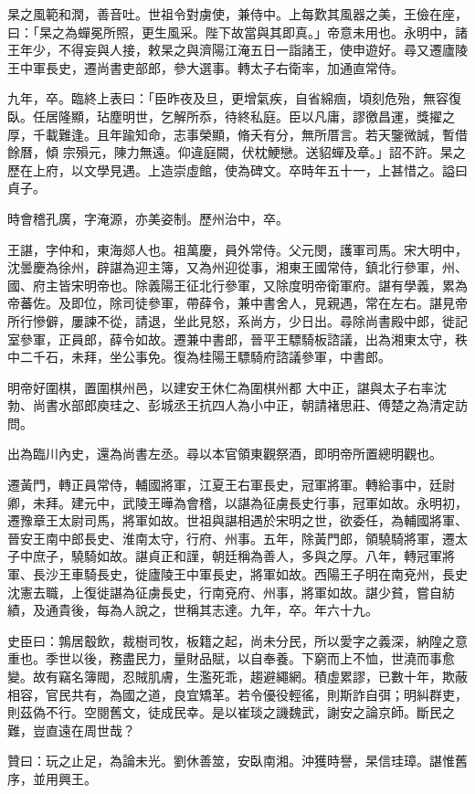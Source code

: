 \begin{pinyinscope}
 杲之風範和潤，善音吐。世祖令對虜使，兼侍中。上每歎其風器之美，王儉在座，曰：「杲之為蟬冕所照，更生風采。陛下故當與其即真。」帝意未用也。永明中，諸王年少，不得妄與人接，敕杲之與濟陽江淹五日一詣諸王，使申遊好。尋又遷廬陵王中軍長史，遷尚書吏部郎，參大選事。轉太子右衛率，加通直常侍。



 九年，卒。臨終上表曰：「臣昨夜及旦，更增氣疾，自省綿痼，頃刻危殆，無容復臥。任居隆顯，玷塵明世，乞解所忝，待終私庭。臣以凡庸，謬徼昌運，獎擢之厚，千載難逢。且年踰知命，志事榮顯，脩夭有分，無所厝言。若天鑒微誠，暫借餘曆，傾
 宗殞元，陳力無遠。仰違庭闕，伏枕鯁戀。送貂蟬及章。」詔不許。杲之歷在上府，以文學見遇。上造崇虛館，使為碑文。卒時年五十一，上甚惜之。謚曰貞子。



 時會稽孔廣，字淹源，亦美姿制。歷州治中，卒。



 王諶，字仲和，東海郯人也。祖萬慶，員外常侍。父元閔，護軍司馬。宋大明中，沈曇慶為徐州，辟諶為迎主簿，又為州迎從事，湘東王國常侍，鎮北行參軍，州、國、府主皆宋明帝也。除義陽王征北行參軍，又除度明帝衛軍府。諶有學義，累為帝蕃佐。及即位，除司徒參軍，帶薛令，兼中書舍人，見親遇，常在左右。諶見帝所行慘僻，屢諫不從，請退，坐此見怒，系尚方，少日出。尋除尚書殿中郎，徙記室參軍，正員郎，薛令如故。遷兼中書郎，晉平王驃騎板諮議，出為湘東太守，秩中二千石，未拜，坐公事免。復為桂陽王驃騎府諮議參軍，中書郎。



 明帝好圍棋，置圍棋州邑，以建安王休仁為圍棋州都
 大中正，諶與太子右率沈勃、尚書水部郎庾珪之、彭城丞王抗四人為小中正，朝請褚思莊、傅楚之為清定訪問。



 出為臨川內史，還為尚書左丞。尋以本官領東觀祭酒，即明帝所置總明觀也。



 遷黃門，轉正員常侍，輔國將軍，江夏王右軍長史，冠軍將軍。轉給事中，廷尉卿，未拜。建元中，武陵王曄為會稽，以諶為征虜長史行事，冠軍如故。永明初，遷豫章王太尉司馬，將軍如故。世祖與諶相遇於宋明之世，欲委任，為輔國將軍、晉安王南中郎長史、淮南太守，行府、州事。五年，除黃門郎，領驍騎將軍，遷太子中庶子，驍騎如故。諶貞正和謹，朝廷稱為善人，多與之厚。八年，轉冠軍將軍、長沙王車騎長史，徙廬陵王中軍長史，將軍如故。西陽王子明在南兗州，長史沈憲去職，上復徙諶為征虜長史，行南兗府、州事，將軍如故。諶少貧，嘗自紡績，及通貴後，每為人說之，世稱其志達。九年，卒。年六十九。



 史臣曰：鶉居鷇飲，裁樹司牧，板籍之起，尚未分民，所以愛字之義深，納隍之意重也。季世以後，務盡民力，量財品賦，以自奉養。下窮而上不恤，世澆而事愈變。故有竊名簿閥，忍賊肌膚，生濫死乖，趨避繩網。積虛累謬，已數十年，欺蔽相容，官民共有，為國之道，良宜矯革。若令優役輕徭，則斯詐自弭；明糾群吏，則茲偽不行。空閱舊文，徒成民幸。是以崔琰之譏魏武，謝安之論京師。斷民之難，豈直遠在周世哉？



 贊曰：玩之止足，為論未光。劉休善筮，安臥南湘。沖獲時譽，杲信珪璋。諶惟舊序，並用興王。



\end{pinyinscope}
